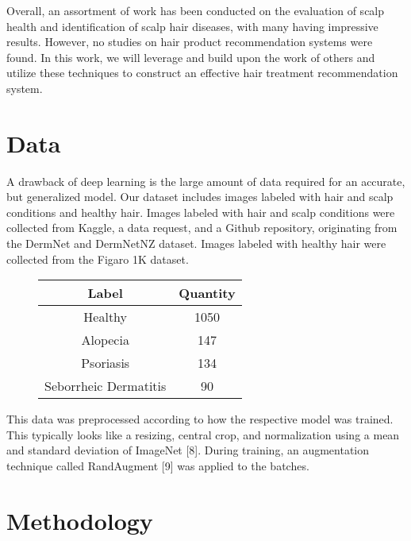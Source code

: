 \documentclass[10pt,twocolumn,letterpaper]{article}
\begin{document}
Overall, an assortment of work has been conducted on the evaluation of scalp health and identification of scalp hair diseases, with many having impressive results. However, no studies on hair product recommendation systems were found. In this work, we will leverage and build upon the work of others and utilize these techniques to construct an effective hair treatment recommendation system.
\section{Data}
A drawback of deep learning is the large amount of data required for an accurate, but generalized model. Our dataset includes images labeled with hair and scalp conditions and healthy hair. Images labeled with hair and scalp conditions were collected from Kaggle, a data request, and a Github repository, originating from the DermNet and DermNetNZ dataset. Images labeled with healthy hair were collected from the Figaro 1K dataset.

\begin{figure}[H]
\centering
\begin{tabular}{ |c|c| }
\hline
 Label & Quantity \\
\hline
 Healthy & 1050 \\
 Alopecia & 147 \\
 Psoriasis & 134 \\
 Seborrheic Dermatitis & 90 \\
\hline
\end{tabular}
\end{figure}
This data was preprocessed according to how the respective model was trained. This typically looks like a resizing, central crop, and normalization using a mean and standard deviation of ImageNet [8]. During training, an augmentation technique called RandAugment [9] was applied to the batches.
\section{Methodology}
\end{document}
